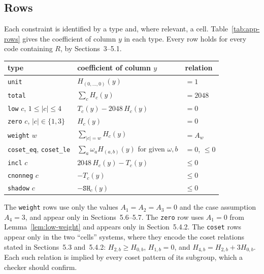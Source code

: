 \documentclass[11pt]{article}
\begin{document}
\subsection{Rows}\label{app:rows}

Each constraint is identified by a type and, where relevant, a cell. Table~\ref{tab:app-rows} gives the coefficient of column \(y\) in each type. Every row holds for every code containing \(R\), by Sections~3--5.1.

{\small
\begin{center}
\label{tab:app-rows}
\begin{tabularx}{\linewidth}{@{}lXl@{}}
\toprule
type & coefficient of column \(y\) & relation \\
\midrule
\texttt{unit} & \(H_{(0,\dots,0)}(y)\) & \(=1\) \\
\texttt{total} & \(\sum_c H_c(y)\) & \(=2048\) \\
\texttt{low} \(c\), \(1\leq|c|\leq4\) & \(T_c(y)-2048\,H_c(y)\) & \(=0\) \\
\texttt{zero} \(c\), \(|c|\in\{1,3\}\) & \(H_c(y)\) & \(=0\) \\
\texttt{weight} \(w\) & \(\sum_{|c|=w}H_c(y)\) & \(=A_w\) \\
\texttt{coset\_eq}, \texttt{coset\_le} & \(\sum_a \omega_a H_{(a,b)}(y)\) for given \(\omega,b\) & \(=0\), \(\leq0\) \\
\texttt{incl} \(c\) & \(2048\,H_c(y)-T_c(y)\) & \(\leq0\) \\
\texttt{cnonneg} \(c\) & \(-T_c(y)\) & \(\leq0\) \\
\texttt{shadow} \(c\) & \(-\mathtt{SH}_c(y)\) & \(\leq0\) \\
\bottomrule
\end{tabularx}
\end{center}
}

The \texttt{weight} rows use only the values \(A_1=A_2=A_3=0\) and the case assumption \(A_4=3\), and appear only in Sections~5.6--5.7. The \texttt{zero} row uses \(A_1=0\) from Lemma~\ref{lem:low-weight} and appears only in Section~5.4.2. The \texttt{coset} rows appear only in the two ``cells'' systems, where they encode the coset relations stated in Sections~5.3 and~5.4.2: \(H_{2,b}\geq H_{0,b}\), \(H_{1,b}=0\), and \(H_{4,b}=H_{2,b}+3H_{0,b}\). Each such relation is implied by every coset pattern of its subgroup, which a checker should confirm.
\end{document}
